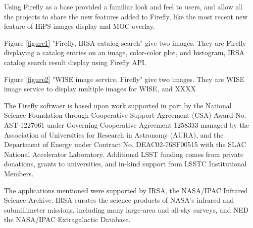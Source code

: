 \documentclass[11pt,twoside]{article}
\begin{document}
Using Firefly as a base provided a familiar look and feel to users, and allow all the projects to share the new features added to Firefly, like the most recent new feature of HiPS images display and MOC overlay. 

Figure \ref{figure1} "Firefly, IRSA catalog search" give two images. They are Firefly displaying a catalog entries on an image, color-color plot, and histogram, 
IRSA catalog search result display using Firefly API. 

Figure \ref{figure2} "WISE image service, Firefly" give two images. They are WISE image service to display multiple images for WISE, and XXXX


\smallskip
\smallskip


\acknowledgements

The Firefly softwaer is based upon work supported in part by the National
Science Foundation through Cooperative Support Agreement (CSA) Award No. AST-1227061 under Governing
Cooperative Agreement 1258333 managed by the Association of Universities for Research in Astronomy (AURA), and
the Department of Energy under Contract No. DEAC02-76SF00515 with the SLAC National Accelerator Laboratory.
Additional LSST funding comes from private donations, grants to universities, and in-kind support from LSSTC
Institutional Members.

\smallskip
The applications mentioned were supported by IRSA, the NASA/IPAC Infrared Science Archive. IRSA curates the science
products of NASA's infrared and submillimeter missions, including many large-area and all-sky surveys, and NED the NASA/IPAC Extragalactic Database.

\end{document}
